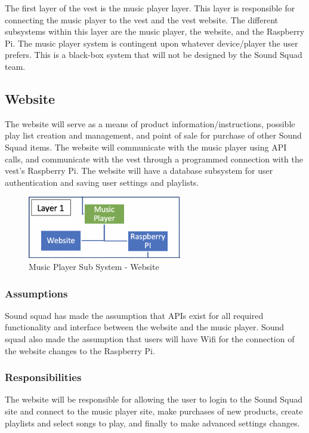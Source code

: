 The first layer of the vest is the music player layer. This layer is responsible for connecting the music player to the vest and the vest website. The different subsystems within this layer are the music player, the website, and the Raspberry Pi. The music player system is contingent upon whatever device/player the user prefers. This is a black-box system that will not be designed by the Sound Squad team.

\subsection{Website}
The website will serve as a means of product information/instructions, possible play list creation and management, and point of sale for purchase of other Sound Squad items. The website will communicate with the music player using API calls, and communicate with the vest through a programmed connection with the vest's Raspberry Pi. The website will have a database subsystem for user authentication and saving user settings and playlists.

\begin{figure}[h!]
	\centering
 	\includegraphics[width=0.60\textwidth]{images/subsystem1}
 \caption{Music Player Sub System - Website}
\end{figure}

\subsubsection{Assumptions}
Sound squad has made the assumption that APIs exist for all required functionality and interface between the website and the music player. Sound squad also made the assumption that users will have Wifi for the connection of the website changes to the Raspberry Pi.

\subsubsection{Responsibilities}
The website will be responsible for allowing the user to login to the Sound Squad site and connect to the music player site, make purchases of new products, create playlists and select songs to play, and finally to make advanced settings changes.

